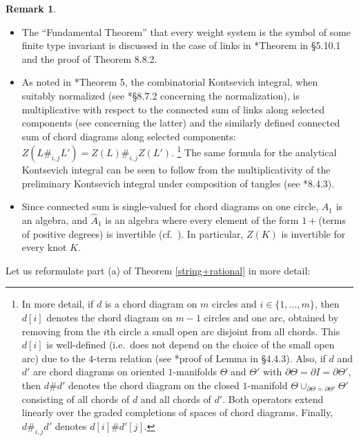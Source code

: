 \documentclass[a4paper,12pt,reqno,oneside]{amsart} %
\theoremstyle{plain}
\theoremstyle{definition}
\newtheorem{remark}[theorem]{Remark}
\theoremstyle{named}
\renewcommand{\:}{\colon}
\begin{document}
\begin{remark}
\begin{itemize}
As noted in \cite{LM2}*{\S5} and \cite{HaMa}*{Remark 3.3}, the proof in \cite{BN} that the analytic Kontsevich integral 
is a universal rational finite type invariant of knots (see also \cite{CDM} concerning this proof) caries over to 
the case of links.
\item The ``Fundamental Theorem'' that every weight system is the symbol of some finite type invariant 
is discussed in the case of links in \cite{CDM}*{Theorem in \S5.10.1 and the proof of Theorem 8.8.2}.
\item As noted in \cite{LM2}*{Theorem 5}, the combinatorial Kontsevich integral, when suitably normalized 
(see \cite{CDM}*{\S8.7.2} concerning the normalization), is multiplicative with respect to the connected sum 
of links along selected components (see \cite{M24-1'} concerning the latter) and the similarly defined 
connected sum of chord diagrams along selected components:
$Z(L\#_{i,j}L')=Z(L)\#_{i,j} Z(L')$.%
\footnote{In more detail, if $d$ is a chord diagram on $m$ circles and $i\in\{1,\dots,m\}$, then $d[i]$ denotes the chord 
diagram on $m-1$ circles and one arc, obtained by removing from the $i$th circle a small open arc disjoint from all chords.
This $d[i]$ is well-defined (i.e.\ does not depend on the choice of the small open arc) due to the $4$-term relation
(see \cite{CDM}*{proof of Lemma in \S4.4.3}).
Also, if $d$ and $d'$ are chord diagrams on oriented $1$-manifolds $\Theta$ and $\Theta'$ with $\partial\Theta=
\partial I=\partial\Theta'$, then $d\# d'$ denotes the chord diagram on the closed $1$-manifold 
$\Theta\cup_{\partial\Theta=\partial\Theta'}\Theta'$ consisting of all chords of $d$ and all chords of $d'$.
Both operators extend linearly over the graded completions of spaces of chord diagrams.
Finally, $d\#_{i,j}d'$ denotes $d[i]\#d'[j]$.}
The same formula for the analytical Kontsevich integral can be seen to follow from the multiplicativity of 
the preliminary Kontsevich integral under composition of tangles (see \cite{CDM}*{8.4.3}).
\item Since connected sum is single-valued for chord diagrams on one circle, $A_1$ is an algebra, and $\hat A_1$
is an algebra where every element of the form $1+$(terms of positive degrees) is invertible (cf.\ \cite{CDM}).
In particular, $Z(K)$ is invertible for every knot $K$.
\end{itemize}
\end{remark}

Let us reformulate part (a) of Theorem \ref{string+rational} in more detail:
\end{document}
